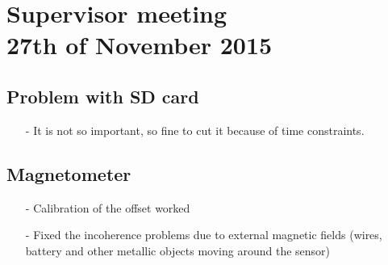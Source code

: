 

\renewcommand\chaptername{KAPITEL}
\renewcommand\contentsname{Indhold}
\renewcommand\figurename{Figur}
\renewcommand\tablename{Tabel}

\section*{Supervisor meeting\\ \small 27th of November 2015}

\subsection{Problem with SD card}
\begin{itemize}
\item[-] It is not so important, so fine to cut it because of time constraints.
\end{itemize}

\subsection{Magnetometer}
\begin{itemize}
\item[-] Calibration of the offset worked
\item[-] Fixed the incoherence problems due to external magnetic fields (wires, battery and other metallic objects moving around the sensor)
\end{itemize}


